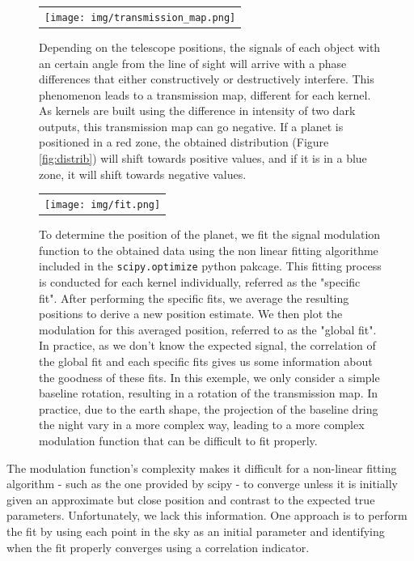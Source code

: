 \documentclass[]{spie}  %
\begin{document}
\begin{figure} [H]
    \begin{center}
    \begin{tabular}{c}
    \texttt{[image: img/transmission\_map.png]}
    \end{tabular}
    \end{center}
    \caption[transmission_map] 
    { \label{fig:transmission_map} 
    Depending on the telescope positions, the signals of each object with an certain angle from the line of sight will arrive with a phase differences that either constructively or destructively interfere. This phenomenon leads to a transmission map, different for each kernel. As kernels are built using the difference in intensity of two dark outputs, this transmission map can go negative. If a planet is positioned in a red zone, the obtained distribution (Figure \ref{fig:distrib}) will shift towards positive values, and if it is in a blue zone, it will shift towards negative values.}
\end{figure}

\begin{figure} [H]
    \begin{center}
    \begin{tabular}{c}
    \texttt{[image: img/fit.png]}
    \end{tabular}
    \end{center}
    \caption[fit] 
    {\label{fig:fit} 
    To determine the position of the planet, we fit the signal modulation function to the obtained data using the non linear fitting algorithme included in the \lstinline{scipy.optimize} python pakcage. This fitting process is conducted for each kernel individually, referred as the "specific fit". After performing the specific fits, we average the resulting positions to derive a new position estimate. We then plot the modulation for this averaged position, referred to as the "global fit". In practice, as we don't know the expected signal, the correlation of the global fit and each specific fits gives us some information about the goodness of these fits. In this exemple, we only consider a simple baseline rotation, resulting in a rotation of the transmission map. In practice, due to the earth shape, the projection of the baseline dring the night vary in a more complex way, leading to a more complex modulation function that can be difficult to fit properly.}
\end{figure}

The modulation function's complexity makes it difficult for a non-linear fitting algorithm - such as the one provided by scipy -  to converge unless it is initially given an approximate but close position and contrast to the expected true parameters. Unfortunately, we lack this information. One approach is to perform the fit by using each point in the sky as an initial parameter and identifying when the fit properly converges using a correlation indicator.
\end{document}
